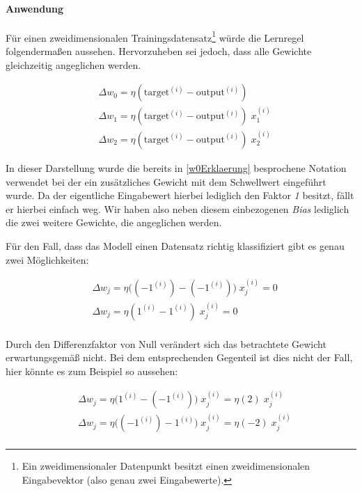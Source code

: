 \paragraph{Anwendung}

Für einen zweidimensionalen Trainingsdatensatz\footnote{Ein zweidimensionaler Datenpunkt besitzt einen zweidimensionalen Eingabevektor (also genau zwei Eingabewerte).} würde die Lernregel folgendermaßen aussehen. Hervorzuheben sei jedoch, dass alle Gewichte gleichzeitig angeglichen werden.

\begin{equation} \label{eq:lernRegAnw}
\begin{aligned}
& \Delta w_0 = \eta(\text{target}^{(i)} - \text{output}^{(i)}) \\
& \Delta w_1 = \eta(\text{target}^{(i)} - \text{output}^{(i)})\;x^{(i)}_{1} \\
& \Delta w_2 = \eta(\text{target}^{(i)} - \text{output}^{(i)})\;x^{(i)}_{2}
\end{aligned}
\end{equation}

In dieser Darstellung wurde die bereits in \ref{w0Erklaerung} besprochene Notation verwendet bei der ein zusätzliches Gewicht mit dem Schwellwert eingeführt wurde. Da der eigentliche Eingabewert hierbei lediglich den Faktor \emph{1} besitzt, fällt er hierbei einfach weg. Wir haben also neben diesem einbezogenen \emph{Bias} lediglich die zwei weitere Gewichte, die angeglichen werden.

Für den Fall, dass das Modell einen Datensatz richtig klassifiziert gibt es genau zwei Möglichkeiten:

\begin{equation}
\begin{aligned}
& \Delta w_j = \eta \big( (-1^{(i)}) - (-1^{(i)}) \big)\;x^{(i)}_{j} = 0 \\
& \Delta w_j = \eta(1^{(i)} - 1^{(i)})\;x^{(i)}_{j} = 0 \\
\end{aligned}
\end{equation}

Durch den Differenzfaktor von Null verändert sich das betrachtete Gewicht erwartungsgemäß nicht. Bei dem entsprechenden Gegenteil ist dies nicht der Fall, hier könnte es zum Beispiel so aussehen:

\begin{equation}
\begin{aligned}
& \Delta w_j = \eta \big( 1^{(i)} - (-1^{(i)}) \big) \;x^{(i)}_{j} = \eta(2)\;x^{(i)}_{j} \\
& \Delta w_j = \eta \big( (-1^{(i)}) - 1^{(i)} \big) \;x^{(i)}_{j} = \eta(-2)\;x^{(i)}_{j} \\
\end{aligned}
\end{equation}


